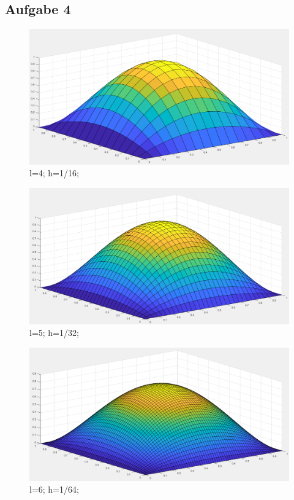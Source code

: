 \documentclass{article}
\begin{document}
    \subsection{Aufgabe 4}
	\begin{figure}
		\includegraphics[width=\linewidth]{Aufgaben-Ressourcen/A4L4.png}
		\caption{l=4; h=1/16;}
		\label{A4L4}
	\end{figure}
\begin{figure}
		\includegraphics[width=\linewidth]{Aufgaben-Ressourcen/A4L5.png} 
		\caption{l=5; h=1/32;}
		\label{A4L5}
	\end{figure}
	\begin{figure}
		\includegraphics[width=\linewidth]{Aufgaben-Ressourcen/A4L6.png} 
		\caption{l=6; h=1/64;}
		\label{A4L6}
	\end{figure}
\end{document}

